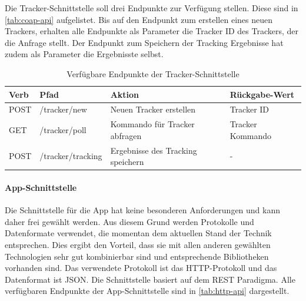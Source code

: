 
Die Tracker-Schnittstelle soll drei Endpunkte zur Verfügung stellen.
Diese sind in \autoref{tab:coap-api} aufgelistet.
Bis auf den Endpunkt zum erstellen eines neuen Trackers, erhalten alle Endpunkte als Parameter die Tracker ID des Trackers, der die Anfrage stellt.
Der Endpunkt zum Speichern der Tracking Ergebnisse hat zudem als Parameter die Ergebnisste selbst.

\begin{table}[]
\begin{tabular}{l|l|l|l}
\textbf{Verb} & \textbf{Pfad}     & \textbf{Aktion}                   & \textbf{Rückgabe-Wert}    \\ \hline
POST          & /tracker/new      & Neuen Tracker erstellen           & Tracker ID \\ \hline
GET           & /tracker/poll     & Kommando für Tracker abfragen     & Tracker Kommando   \\ \hline
POST          & /tracker/tracking & Ergebnisse des Tracking speichern & -
\end{tabular}
\caption{\label{tab:coap-api}Verfügbare Endpunkte der Tracker-Schnittstelle}
\end{table}

\FloatBarrier
\paragraph{App-Schnittstelle}
Die Schnittstelle für die App hat keine besonderen Anforderungen und kann daher frei gewählt werden.
Aus diesem Grund werden Protokolle und Datenformate verwendet, die momentan dem aktuellen Stand der
Technik entsprechen. 
Dies ergibt den Vorteil, dass sie mit allen anderen gewählten Technologien sehr gut kombinierbar sind und entsprechende Bibliotheken vorhanden sind.
Das verwendete Protokoll ist das \gls{HTTP}-Protokoll und das Datenformat ist \gls{JSON}.
Die Schnittstelle basiert auf dem \gls{REST} Paradigma. 
Alle verfügbaren Endpunkte der App-Schnittstelle sind in \autoref{tab:http-api} dargestellt.

